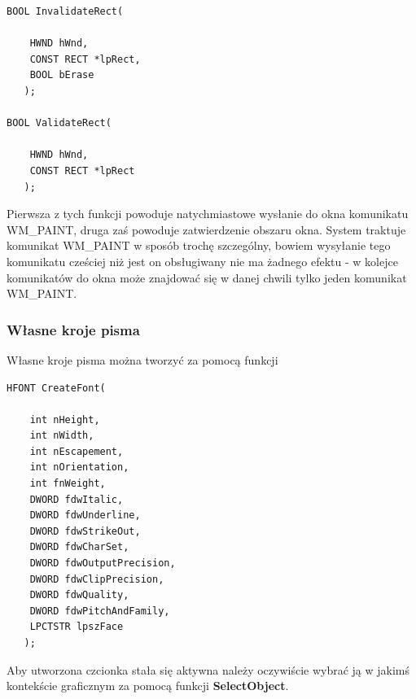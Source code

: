 \begin{scriptsize}
\begin{verbatim}
BOOL InvalidateRect(

    HWND hWnd,	
    CONST RECT *lpRect,	
    BOOL bErase	
   );

BOOL ValidateRect(

    HWND hWnd,	
    CONST RECT *lpRect	
   );
\end{verbatim}
\end{scriptsize}

Pierwsza z tych funkcji powoduje natychmiastowe wysłanie do okna komunikatu WM\_PAINT, druga zaś powoduje
zatwierdzenie obszaru okna. System traktuje komunikat WM\_PAINT w sposób trochę szczególny, bowiem wysyłanie
tego komunikatu cześciej niż jest on obsługiwany nie ma żadnego efektu - w kolejce komunikatów do 
okna może znajdować się w danej chwili tylko jeden komunikat WM\_PAINT.

\subsubsection{Własne kroje pisma}

Własne kroje pisma można tworzyć za pomocą funkcji
\begin{scriptsize}
\begin{verbatim}
HFONT CreateFont(

    int nHeight,	
    int nWidth,	
    int nEscapement,	
    int nOrientation,	
    int fnWeight,	
    DWORD fdwItalic,	
    DWORD fdwUnderline,	
    DWORD fdwStrikeOut,	
    DWORD fdwCharSet,	
    DWORD fdwOutputPrecision,	
    DWORD fdwClipPrecision,	
    DWORD fdwQuality,	
    DWORD fdwPitchAndFamily,	
    LPCTSTR lpszFace 	
   );
\end{verbatim}
\end{scriptsize}

Aby utworzona czcionka stała się aktywna należy oczywiście wybrać ją w jakimś kontekście graficznym za pomocą
funkcji {\bf SelectObject}.